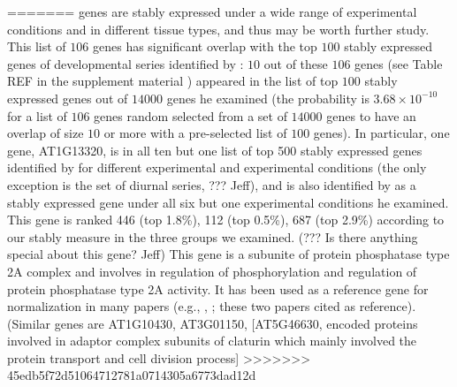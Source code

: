 \documentclass[11pt, a4paper]{article}
\begin{document}
=======
genes are stably expressed under a wide range of experimental conditions
and in different tissue types, and thus may be worth further study.  
This list of $106$ genes has significant overlap with the top $100$ stably
expressed genes of developmental series identified by \cite{czechowski2005genome}:
$10$ out of these $106$ genes (see Table REF in the supplement material ) appeared in the list of top $100$ stably expressed genes out of $14000$ genes he examined (the
probability is $3.68\times10^{-10}$ for a list of $106$ genes random selected
from a set of $14000$ genes to have an overlap of size $10$ or more with a
pre-selected list of $100$ genes). In particular, one gene, AT1G13320, is in all ten but one list of top 500 stably expressed genes identified by
\cite{czechowski2005genome} for different experimental and experimental
conditions (the only exception is the set of diurnal series, ??? Jeff),
and is also identified by \cite{hong2010identification} as a stably expressed gene under all six but one experimental conditions he examined.
This gene is ranked 446 (top 1.8\%), 112 (top 0.5\%), 687 (top 2.9\%)
according to our stably measure in the three groups we examined.  (??? Is
there anything special about this gene? Jeff) This gene is a subunite of
protein phosphatase type 2A complex and involves in regulation of
phosphorylation and regulation of protein phosphatase type 2A activity. It has
been used as a reference gene for normalization in many papers
(e.g., \cite{bournier2013arabidopsis}, \cite{baron2012transcriptional}; these
two papers cited \cite{czechowski2005genome} as reference). (Similar genes are AT1G10430,
AT3G01150, [AT5G46630, encoded proteins involved in adaptor complex subunits
of claturin which mainly involved the protein transport and cell division
process]
>>>>>>> 45edb5f72d51064712781a0714305a6773dad12d
\end{document}
